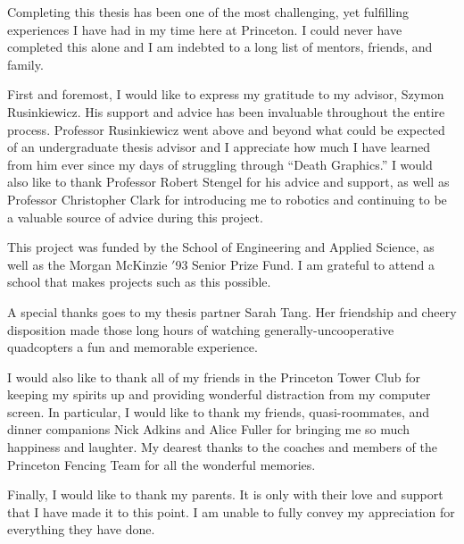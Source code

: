 Completing this thesis has been one of the most challenging, yet fulfilling experiences I have had in my time here at Princeton. I could never have completed this alone and I am indebted to a long list of mentors, friends, and family.

First and foremost, I would like to express my gratitude to my advisor, Szymon Rusinkiewicz. His support and advice has been invaluable throughout the entire process. Professor Rusinkiewicz went above and beyond what could be expected of an undergraduate thesis advisor and I appreciate how much I have learned from him ever since my days of struggling through ``Death Graphics.'' I would also like to thank Professor Robert Stengel for his advice and support, as well as Professor Christopher Clark for introducing me to robotics and continuing to be a valuable source of advice during this project.

This project was funded by the School of Engineering and Applied Science, as well as the Morgan McKinzie $'$93 Senior Prize Fund. I am grateful to attend a school that makes projects such as this possible.

A special thanks goes to my thesis partner Sarah Tang. Her friendship and cheery disposition made those long hours of watching generally-uncooperative quadcopters a fun and memorable experience.

I would also like to thank all of my friends in the Princeton Tower Club for keeping my spirits up and providing wonderful distraction from my computer screen. In particular, I would like to thank my friends, quasi-roommates, and dinner companions Nick Adkins and Alice Fuller for bringing me so much happiness and laughter. My dearest thanks to the coaches and members of the Princeton Fencing Team for all the wonderful memories.

Finally, I would like to thank my parents. It is only with their love and support that I have made it to this point. I am unable to fully convey my appreciation for everything they have done.

